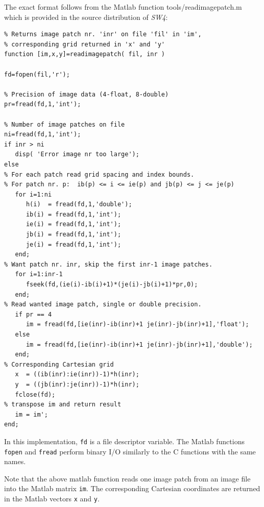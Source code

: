 \documentclass[11pt]{report}
\begin{document}
The exact format follows from the Matlab function tools/readimagepatch.m which is provided in the
source distribution of \emph{SW4}:
\begin{verbatim}
% Returns image patch nr. 'inr' on file 'fil' in 'im', 
% corresponding grid returned in 'x' and 'y'
function [im,x,y]=readimagepatch( fil, inr )

fd=fopen(fil,'r');

% Precision of image data (4-float, 8-double)
pr=fread(fd,1,'int');

% Number of image patches on file
ni=fread(fd,1,'int');
if inr > ni
   disp( 'Error image nr too large');
else
% For each patch read grid spacing and index bounds. 
% For patch nr. p:  ib(p) <= i <= ie(p) and jb(p) <= j <= je(p)
   for i=1:ni
      h(i)  = fread(fd,1,'double');
      ib(i) = fread(fd,1,'int');
      ie(i) = fread(fd,1,'int');
      jb(i) = fread(fd,1,'int');
      je(i) = fread(fd,1,'int');
   end;
% Want patch nr. inr, skip the first inr-1 image patches.
   for i=1:inr-1
      fseek(fd,(ie(i)-ib(i)+1)*(je(i)-jb(i)+1)*pr,0);
   end;
% Read wanted image patch, single or double precision.
   if pr == 4 
      im = fread(fd,[ie(inr)-ib(inr)+1 je(inr)-jb(inr)+1],'float');
   else
      im = fread(fd,[ie(inr)-ib(inr)+1 je(inr)-jb(inr)+1],'double');
   end;
% Corresponding Cartesian grid 
   x  = ((ib(inr):ie(inr))-1)*h(inr);
   y  = ((jb(inr):je(inr))-1)*h(inr);
   fclose(fd);
% transpose im and return result
   im = im';
end;
\end{verbatim}
In this implementation, {\tt fd} is a file descriptor variable. The Matlab functions {\tt fopen} and
{\tt fread} perform binary I/O similarly to the C functions with the same names.

Note that the above matlab function reads one image patch from an image file into the Matlab matrix
{\tt im}. The corresponding Cartesian coordinates are returned in the Matlab vectors {\tt x} and
{\tt y}.


\end{document}
